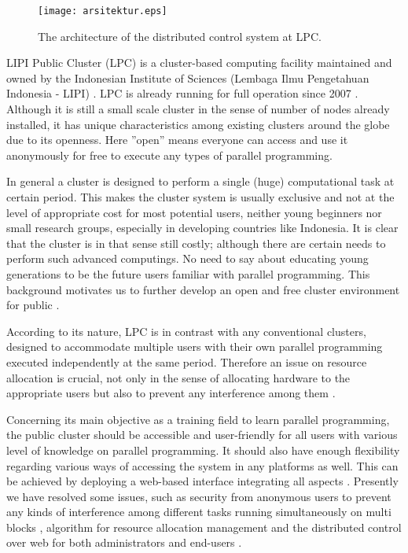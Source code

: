 \documentclass[conference,letterpaper]{IEEEtran}
\begin{document}
\begin{figure*}[t]
 \centering
 \texttt{[image: arsitektur.eps]}
 \caption{The architecture of the distributed control system at LPC.}
 \label{fig:arsitektur}
\end{figure*}

LIPI Public Cluster (LPC) is a cluster-based computing facility maintained and owned by the Indonesian Institute of Sciences (Lembaga Ilmu Pengetahuan Indonesia - LIPI) \cite{lpc1}. LPC is already running for full operation since 2007 \cite{lpc2}. Although it is still a small scale cluster in the sense of number of nodes already installed, it has unique characteristics among existing clusters around the globe due to its openness. Here ”open” means everyone can access and use it anonymously for free to execute any types of parallel programming. 

In general a cluster is designed to perform a single (huge) computational task at certain period. This makes the cluster system is usually exclusive and not at the level of appropriate cost for most potential users, neither young beginners nor small research groups, especially in developing countries like Indonesia. It is clear that the cluster is in that sense still costly; although there are certain needs to perform such advanced computings. No need to say about educating young generations to be the future users familiar with parallel programming. This background motivates us to further develop an open and free cluster environment for public \cite{lpc3}. 

According to its nature, LPC is in contrast with any conventional clusters, designed to accommodate multiple users with their own parallel programming executed independently at the same period. Therefore an issue on resource allocation is crucial, not only in the sense of allocating hardware to the appropriate users but also to prevent any interference among them \cite{lpc4}.

Concerning its main objective as a training field to learn parallel programming, the public cluster should be accessible and user-friendly for all users with various level of knowledge on parallel programming. It should also have enough flexibility regarding various ways of accessing the system in any platforms as well. This can be achieved by deploying a web-based interface integrating all aspects \cite{lpc6}. Presently we have resolved some issues, such as security from anonymous users to prevent any kinds of interference among different tasks running simultaneously on multi blocks \cite{lpc4}, algorithm for resource allocation management and the distributed control over web for both administrators and end-users \cite{lpc5}.
\end{document}

